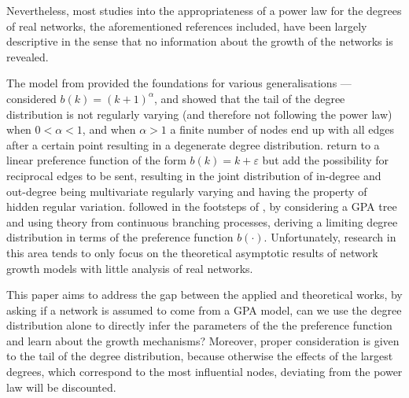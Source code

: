 \documentclass[
  sn-basic,
  10pt,
]{sn-jnl}
\theoremstyle{plain}
\theoremstyle{plain}
\theoremstyle{remark}
\begin{document}
Nevertheless, most studies into the appropriateness of a power law for
the degrees of real networks, the aforementioned references included,
have been largely descriptive in the sense that no information about the
growth of the networks is revealed.

The model from \citet{Barabasi99} provided the foundations for various
generalisations --- \citet{krapivsky01} considered
\(b(k) = (k+1)^\alpha\), and showed that the tail of the degree
distribution is not regularly varying (and therefore not following the
power law) when \(0<\alpha<1\), and when \(\alpha>1\) a finite number of
nodes end up with all edges after a certain point resulting in a
degenerate degree distribution. \citet{wang2022random} return to a
linear preference function of the form \(b(k) = k+\varepsilon\) but add
the possibility for reciprocal edges to be sent, resulting in the joint
distribution of in-degree and out-degree being multivariate regularly
varying and having the property of hidden regular variation.
\citet{rudas07} followed in the footsteps of \citet{krapivsky01}, by
considering a GPA tree and using theory from continuous branching
processes, deriving a limiting degree distribution in terms of the
preference function \(b(\cdot)\). Unfortunately, research in this area
tends to only focus on the theoretical asymptotic results of network
growth models with little analysis of real networks.

This paper aims to address the gap between the applied and theoretical
works, by asking if a network is assumed to come from a GPA model, can
we use the degree distribution alone to directly infer the parameters of
the the preference function and learn about the growth mechanisms?
Moreover, proper consideration is given to the tail of the degree
distribution, because otherwise the effects of the largest degrees,
which correspond to the most influential nodes, deviating from the power
law will be discounted.
\end{document}
